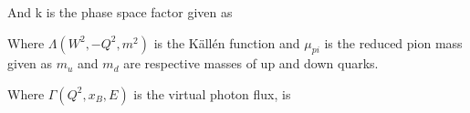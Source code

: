             
         
               
            And k is the phase space factor given as 
            
                Where $\Lambda(W^2,-Q^2,m^2)$ is the Källén function and $\mu_{pi}$ is the reduced pion mass given as 
            $m_u$ and $m_d$ are respective masses of up and down quarks.
            
             Where $\Gamma (Q^2, x_B, E)$ is the virtual photon flux, is 

\fi
